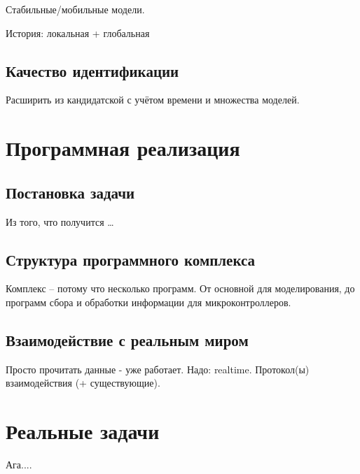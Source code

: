 \documentclass[a4paper,12pt]{article}
\newcommand{\Cmt}[1]{ {\small\color{red}#1} }
\begin{document}
Стабильные/мобильные модели.

История: локальная + глобальная

\subsection{Качество идентификации}

\Cmt{Расширить из кандидатской с учётом времени и множества моделей.}



\section{Программная реализация}

\subsection{Постановка задачи}

\Cmt{Из того, что получится \ldots}

\subsection{Структура программного комплекса}

Комплекс -- потому что несколько программ.
От основной для моделирования, до программ сбора и обработки
информации для микроконтроллеров.

\subsection{Взаимодействие с реальным миром}

\Cmt{
Просто прочитать данные - уже работает.
Надо: realtime.
Протокол(ы) взаимодействия (+ существующие).
}


\section{Реальные задачи}

\Cmt{
Ага....
}







\end{document}
